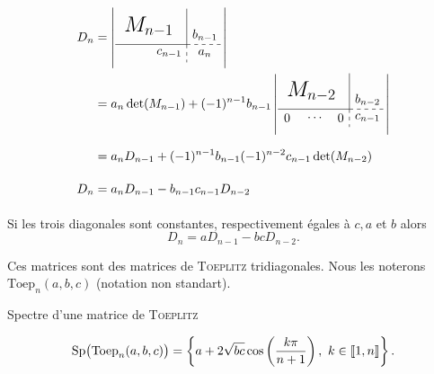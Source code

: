 \newcommand{\dettrignmoinsun}{
\left|\begin{gathered}
    \tikzpicture[every node/.style={anchor=south west}]
        \node[minimum width=1.5cm,minimum height=1cm] at (0.125,0.5) {\LARGE $M_{n-2}$};
        \node[minimum width=0.5cm,minimum height=0.5cm] at (0,0) {$0$};
        \node[minimum width=0.5cm,minimum height=0.5cm] at (0.7,0) {$\cdots$};
        \node[minimum width=0.5cm,minimum height=0.5cm] at (1.5,0) {$0$};
        \node[minimum width=1cm,minimum height=0.5cm] at (2,0) {$c_{n-1}$};
        \node[minimum width=1cm,minimum height=1cm] at (2,0.25) {$b_{n-2}$};
        \draw (0,0.5) -- (2,0.5);
        \draw (2,0.5) -- (2,1.5);
        \draw[dashed] (2,0.5) -- (3,0.5);
        \draw[dashed] (2,0.5) -- (2,0);
    \endtikzpicture
    \end{gathered}\right|
}

\begin{preuve}
    \begin{align*}
        D_n &= \dettrign \\
            &= a_n \det(M_{n-1}) + (-1)^{n-1} b_{n-1} \dettrignmoinsun \\
            &= a_n D_{n-1} + (-1)^{n-1} b_{n-1} (-1)^{n-2} c_{n-1} \det(M_{n-2}) \\
        D_n &= a_n D_{n-1} - b_{n-1} c_{n-1} D_{n-2}
    \end{align*}
\end{preuve}

\begin{corol} \label{relation_det_toep_trig}
    Si les trois diagonales sont constantes, respectivement égales à $c, a$ et $b$ alors
    $$D_n = aD_{n-1} - bc D_{n-2}.$$
\end{corol}


Ces matrices sont des matrices de \textsc{Toeplitz} tridiagonales. Nous les noterons $\mathrm{Toep}_n (a,b,c)$ (notation non standart). 

\begin{prop}{Spectre d'une matrice de \textsc{Toeplitz}}
    
    $$\mathrm{Sp} \big( \mathrm{Toep}_n(a,b,c) \big) = \left \{ a + 2 \sqrt{bc} \cos \left( \frac{k \pi}{n+1} \right) ,\ k \in \llbracket 1, n \rrbracket \right \}.$$
\end{prop}

